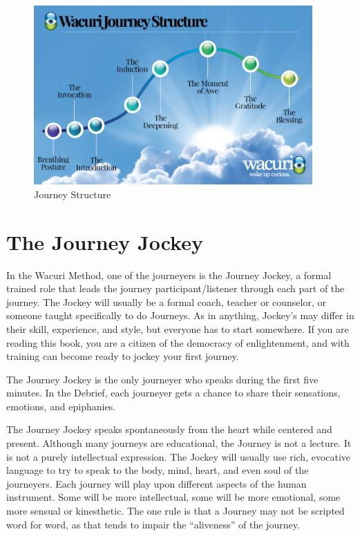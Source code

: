 \documentclass[12pt]{book}
\begin{document}
\begin{figure}
  \centering
     \includegraphics[width=0.95\textwidth]{WacuriFigures/Wacuri-Journey-Structure4.png}
     \caption{Journey Structure}
  \label{fig:journey}     
\end{figure}



\section{The Journey Jockey}

In the Wacuri Method, one of the journeyers is the Journey Jockey, a
formal trained role that leads the journey participant/listener through each part of the journey. The Jockey will usually be
a formal coach, teacher or counselor, or someone taught specifically to do Journeys. As in
anything, Jockey’s may differ in their skill, experience, and style,
but everyone has to start somewhere. If you are reading this book, you
are a citizen of the democracy of enlightenment, and with training can
become ready to jockey your first journey.
					
The Journey Jockey is the only journeyer who speaks during the first
five minutes. In the Debrief, each journeyer gets a chance to share
their sensations, emotions, and epiphanies.
					
The Journey Jockey speaks spontaneously from the heart while centered
and present.   Although many journeys are
educational, the Journey is not a lecture. It is not a purely
intellectual expression. The Jockey will usually use rich, evocative
language to try to speak to the body, mind, heart, and even soul of
the journeyers. Each journey will play upon different aspects of the
human instrument. Some will be more intellectual, some will be more
emotional, some more sensual or kinesthetic. The one rule is that a Journey may not
be scripted word for word, as that tends to impair the ``aliveness'' of the journey.
					
\end{document}
